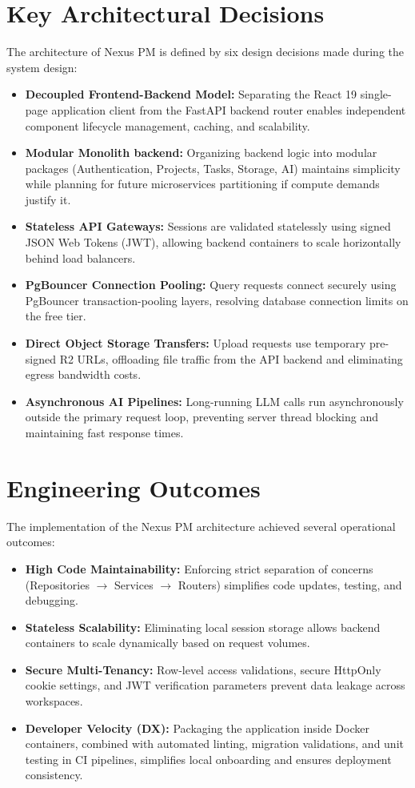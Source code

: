 \section{Key Architectural Decisions}
The architecture of Nexus PM is defined by six design decisions made during the system design:
\begin{itemize}
    \item \textbf{Decoupled Frontend-Backend Model:} Separating the React 19 single-page application client from the FastAPI backend router enables independent component lifecycle management, caching, and scalability.
    \item \textbf{Modular Monolith backend:} Organizing backend logic into modular packages (Authentication, Projects, Tasks, Storage, AI) maintains simplicity while planning for future microservices partitioning if compute demands justify it.
    \item \textbf{Stateless API Gateways:} Sessions are validated statelessly using signed JSON Web Tokens (JWT), allowing backend containers to scale horizontally behind load balancers.
    \item \textbf{PgBouncer Connection Pooling:} Query requests connect securely using PgBouncer transaction-pooling layers, resolving database connection limits on the free tier.
    \item \textbf{Direct Object Storage Transfers:} Upload requests use temporary pre-signed R2 URLs, offloading file traffic from the API backend and eliminating egress bandwidth costs.
    \item \textbf{Asynchronous AI Pipelines:} Long-running LLM calls run asynchronously outside the primary request loop, preventing server thread blocking and maintaining fast response times.
\end{itemize}

\section{Engineering Outcomes}
The implementation of the Nexus PM architecture achieved several operational outcomes:
\begin{itemize}
    \item \textbf{High Code Maintainability:} Enforcing strict separation of concerns (Repositories $\rightarrow$ Services $\rightarrow$ Routers) simplifies code updates, testing, and debugging.
    \item \textbf{Stateless Scalability:} Eliminating local session storage allows backend containers to scale dynamically based on request volumes.
    \item \textbf{Secure Multi-Tenancy:} Row-level access validations, secure HttpOnly cookie settings, and JWT verification parameters prevent data leakage across workspaces.
    \item \textbf{Developer Velocity (DX):} Packaging the application inside Docker containers, combined with automated linting, migration validations, and unit testing in CI pipelines, simplifies local onboarding and ensures deployment consistency.
\end{itemize}

